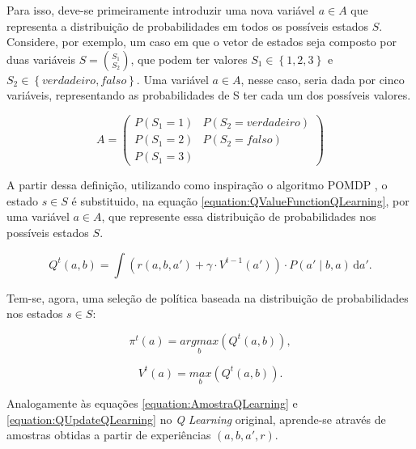Para isso, deve-se primeiramente introduzir uma nova variável $ a \in A $ que representa a distribuição de probabilidades em todos os possíveis estados $ S $. Considere, por exemplo, um caso em que o vetor de estados seja composto por duas variáveis $ S = \binom{S_1}{S_2} $, que podem ter valores $ S_1 \in \left\{1,2,3\right\} $ e $ S_2 \in \left\{verdadeiro, falso\right\} $. Uma variável $ a \in A $, nesse caso, seria dada por cinco variáveis, representando as probabilidades de S ter cada um dos possíveis valores.

$$
	A = \left(
	\begin{matrix}
		P \left( S_1 = 1 \right) & P \left( S_2 = verdadeiro \right) \\
		P \left( S_1 = 2 \right) & P \left( S_2 = falso \right) \\
		P \left( S_1 = 3 \right) &  
	\end{matrix} \right)
$$

A partir dessa definição, utilizando como inspiração o algoritmo POMDP \cite{Thrun:2005:PR:1121596}, o estado $ s \in S $ é substituido, na equação \ref{equation:QValueFunctionQLearning}, por uma variável $ a \in A $, que represente essa distribuição de probabilidades nos possíveis estados $ S $.

\begin{equation} \label{equation:QValueFunctionPartiallyObservable}
    Q^t \left( a, b \right) = \int \! \left( r \left( a, b, a' \right) + \gamma \cdot V^{t-1} \left( a' \right) \right) \cdot P \left( a' \mid b, a \right) \, \mathrm{d}a'.
\end{equation}

Tem-se, agora, uma seleção de política baseada na distribuição de probabilidades nos estados $ s \in S $:

\begin{equation} \label{equation:PolicySelectionPartiallyObservable}
    \pi^t \left( a \right) = \underset{b}{argmax} \left( Q^t \left( a, b \right) \right),
\end{equation}

\begin{equation}
    V^t \left( a \right) = \underset{b}{max} \left( Q^t \left( a, b \right) \right).
\end{equation}


Analogamente às equações \ref{equation:AmostraQLearning} e \ref{equation:QUpdateQLearning} no \textit{Q Learning} original, aprende-se através de amostras obtidas a partir de experiências $ \left( a, b, a', r \right) $.


